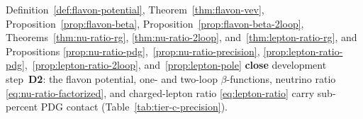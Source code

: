 \begin{corollary}[D2 closure]\label{cor:flavon-d2}
Definition~\ref{def:flavon-potential}, Theorem~\ref{thm:flavon-vev},
Proposition~\ref{prop:flavon-beta},
Proposition~\ref{prop:flavon-beta-2loop}, Theorems~\ref{thm:nu-ratio-rg},
\ref{thm:nu-ratio-2loop}, and~\ref{thm:lepton-ratio-rg}, and Propositions
\ref{prop:nu-ratio-pdg},~\ref{prop:nu-ratio-precision},
\ref{prop:lepton-ratio-pdg},~\ref{prop:lepton-ratio-2loop},
and~\ref{prop:lepton-pole}
\textbf{close} development step~\textbf{D2}: the flavon potential,
one- and two-loop $\beta$-functions, neutrino ratio
\eqref{eq:nu-ratio-factorized}, and charged-lepton ratio
\eqref{eq:lepton-ratio} carry sub-percent PDG contact
(Table~\ref{tab:tier-c-precision}).
\end{corollary}